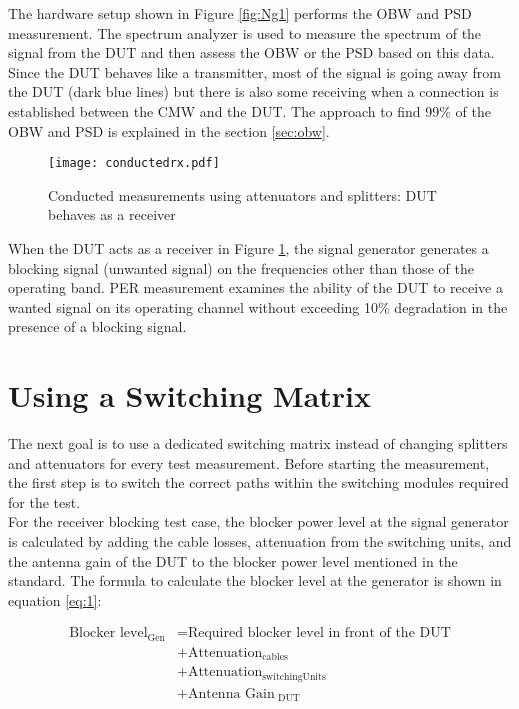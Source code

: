 The hardware setup shown in Figure \ref{fig:Ng1} performs the \acf{OBW} and \acf{PSD} measurement. The spectrum analyzer is used to measure the spectrum of the signal from the \acs{DUT} and then assess the \acf{OBW} or the \acf{PSD} based on this data. Since the \acs{DUT} behaves like a transmitter, most of the signal is going away from the \acs{DUT} (dark blue lines) but there is also some receiving when a connection is established between the \acf{CMW} and the \acs{DUT}. The approach to find 99\% of the \acf{OBW} and \acf{PSD} is explained in the section \ref{sec:obw}.

\begin{figure}[H]
\centering
   \texttt{[image: conductedrx.pdf]}
 \vspace{-0.5cm} \caption{Conducted measurements using attenuators and splitters: \acs{DUT} behaves as a receiver}
   \label{fig:Ng2}
\end{figure}

When the \acs{DUT} acts as a receiver in Figure \ref{fig:Ng2}, the signal generator generates a blocking signal (unwanted signal) on the frequencies other than those of the operating band.  \acf{PER} measurement examines the ability of the \acs{DUT} to receive a wanted signal on its operating channel without exceeding 10\% degradation in the presence of a blocking signal. 

\section{Using a Switching Matrix}
\label{sec:switch}
The next goal is to use a dedicated switching matrix instead of changing splitters and attenuators for every test measurement. Before starting the measurement, the first step is to switch the correct paths within the switching modules required for the test. \\

For the receiver blocking test case, the blocker power level at the signal generator is calculated by adding the cable losses, attenuation from the switching units, and the antenna gain of the \acs{DUT} to the blocker power level mentioned in the standard. The formula to calculate the blocker level at the generator is shown in equation \ref{eq:1}:

\begin{equation}
\begin{aligned}
\mbox{Blocker level}_ {\mbox{Gen}}  &= \mbox{Required blocker level in front of the DUT} \\
&+ \mbox{Attenuation}_{\mbox{cables}} \\
&+ \mbox{Attenuation}_{\mbox{switchingUnits}}  \\
&+ \mbox{Antenna Gain}_{\mbox{ DUT}}
\label{eq:1}
\end{aligned}
\end{equation}

